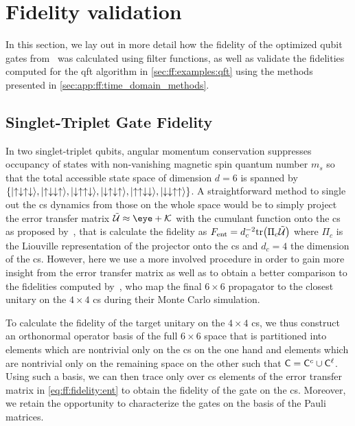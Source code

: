 \section{Fidelity validation}\label{sec:app:ff:fidelity}
In this section, we lay out in more detail how the fidelity of the optimized \sts qubit gates from~ was calculated using filter functions, as well as validate the fidelities computed for the \gls{qft} algorithm in \cref{sec:ff:examples:qft} using the methods presented in \cref{sec:app:ff:time_domain_methods}.
\subsection{Singlet-Triplet Gate Fidelity}\label{subsec:app:ff:fidelity:singlet-triplet}
In two singlet-triplet qubits, angular momentum conservation suppresses occupancy of states with non\hyp{}vanishing magnetic spin quantum number $m_s$ so that the total accessible state space of dimension $d=6$ is spanned by $\lbrace\mbox{\ensuremath{\ket{\uparrow\downarrow\uparrow\downarrow}}},\mbox{\ensuremath{\ket{\uparrow\downarrow\downarrow\uparrow}}},\mbox{\ensuremath{\ket{\downarrow\uparrow\uparrow\downarrow}}},\mbox{\ensuremath{\ket{\downarrow\uparrow\downarrow\uparrow}}},\mbox{\ensuremath{\ket{\uparrow\uparrow\downarrow\downarrow}}},\mbox{\ensuremath{\ket{\downarrow\downarrow\uparrow\uparrow}}}\rbrace$.
A straightforward method to single out the \gls{cs} dynamics from those on the whole space would be to simply project the error transfer matrix $\liouvUe\approx\eye + \cumulantfun$ with \cumulantfun the cumulant function onto the \gls{cs} as proposed by~\textcite{Wood2018}, that is calculate the fidelity as $F_{\mathrm{ent}} = d_c^{-2}\mathrm{tr}\bigl(\Pi_c\mathcal{\tilde{U}}\bigr)$ where $\Pi_c$ is the Liouville representation of the projector onto the \gls{cs} and $d_c = 4$ the dimension of the \gls{cs}.
However, here we use a more involved procedure in order to gain more insight from the error transfer matrix as well as to obtain a better comparison to the fidelities computed by~\textcite{Cerfontaine2020}, who map the final $6\times 6$ propagator to the closest unitary on the $4\times 4$ \gls{cs} during their Monte Carlo simulation.

To calculate the fidelity of the target unitary on the $4\times 4$ \gls{cs}, we thus construct an orthonormal operator basis \basis of the full $6\times 6$ space that is partitioned into elements which are nontrivial only on the \gls{cs} on the one hand and elements which are nontrivial only on the remaining space on the other such that $\mathsf{C} = \mathsf{C}^c\cup\mathsf{C}^\ell$.
Using such a basis, we can then trace only over \gls{cs} elements of the error transfer matrix \liouvUe in \cref{eq:ff:fidelity:ent} to obtain the fidelity of the gate on the \gls{cs}.
Moreover, we retain the opportunity to characterize the gates on the basis of the Pauli matrices.

